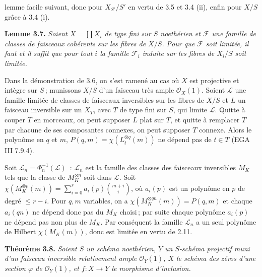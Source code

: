 lemme facile suivant, donc pour \(X_{S'}/S'\) en vertu de 3.5 et 3.4 (ii), enfin pour \(X/S\) gr\^ace \`a 3.4 (i).

\textbf{Lemme 3.7.} \emph{Soient \(X=\coprod X_i\) de type fini sur \(S\) noeth\'erien et \(\mathcal F\) une famille de classes de faisceaux coh\'erents sur les fibres de \(X/S\). Pour que \(\mathcal F\) soit limit\'ee, il faut et il suffit que pour tout \(i\) la famille \(\mathcal F_i\) induite sur les fibres de \(X_i/S\) soit limit\'ee.}

Dans la d\'emonstration de 3.6, on s'est ramen\'e au cas o\`u \(X\) est projective et int\`egre sur \(S\)\,; munissons \(X/S\) d'un faisceau tr\`es ample \(\mathcal O_X(1)\). Soient \(\mathcal L\) une famille limit\'ee de classes de faisceaux inversibles sur les fibres de \(X/S\) et \(L\) un faisceau inversible sur un \(X_T\), avec \(T\) de type fini sur \(S\), qui limite \(\mathcal L\). Quitte \`a couper \(T\) en morceaux, on peut supposer \(L\) plat sur \(T\), et quitte \`a remplacer \(T\) par chacune de ses composantes connexes, on peut supposer \(T\) connexe. Alors le polyn\^ome en \(q\) et \(m\), \(P(q,m)=\chi(L_t^{\otimes q}(m))\) ne d\'epend pas de \(t\in T\) (EGA III 7.9.4).

Soit \(\mathcal L_n=\Phi_n^{-1}(\mathcal L)\)~: \(\mathcal L_n\) est la famille des classes des faisceaux inversibles \(M_K\) tels que la classe de \(M_K^{\otimes n}\) soit dans \(\mathcal L\). Soit \(\chi(M_K^{\otimes p}(m))=\sum_{i=0}^{r}a_i(p)\binom{m+i}{i}\), o\`u \(a_i(p)\) est un polyn\^ome en \(p\) de degr\'e \(\le r-i\). Pour \(q,m\) variables, on a \(\chi(M_K^{\otimes qn}(m))=P(q,m)\) et chaque \(a_i(qn)\) ne d\'epend donc pas du \(M_K\) choisi\,; par suite chaque polyn\^ome \(a_i(p)\) ne d\'epend pas non plus de \(M_K\). Par cons\'equent la famille \(\mathcal L_n\) a un seul polyn\^ome de Hilbert \(\chi(M_K(m))\), donc est limit\'ee en vertu de 2.11.

\textbf{Th\'eor\`eme 3.8.} \emph{Soient \(S\) un sch\'ema noeth\'erien, \(Y\) un \(S\)-sch\'ema projectif muni d'un faisceau inversible relativement ample \(\mathcal O_Y(1)\), \(X\) le sch\'ema des z\'eros d'une section \(\varphi\) de \(\mathcal O_Y(1)\), et \(f:X\to Y\) le morphisme d'inclusion.}
